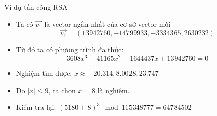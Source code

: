 \begin{frame}{Ví dụ tấn công RSA}

\begin{itemize}
\item Ta có $\vec{v_1}$ là vector ngắn nhất của cơ sở vector mới
\[
\vec{v_1} = (13942760, -14799933, -3334365, 2630232)
\]
\item Từ đó ta có phương trình đa thức:
\[
3608x^3 - 41165x^2 - 1644437x + 13942760 = 0
\]
\item Nghiệm tìm được: $x \approx -20.314, 8.0028, 23.747$
\item Do $|x| \leq 9$, ta chọn $x = 8$ là nghiệm.
\item Kiểm tra lại: $(5180+8)^3 \mod 115348777 = 64784502$
\end{itemize}

\end{frame}
